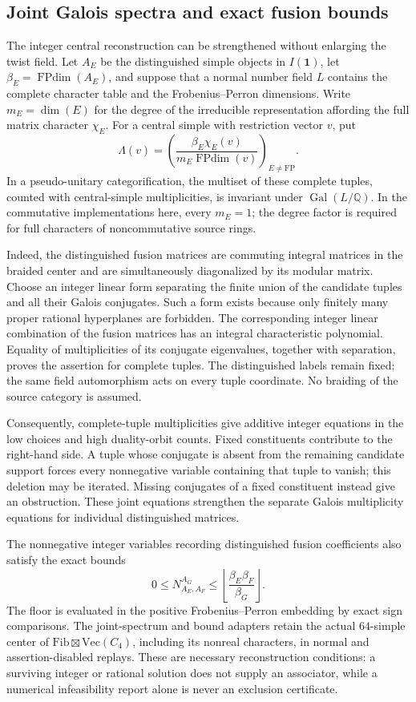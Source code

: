\subsection{Joint Galois spectra and exact fusion bounds}

The integer central reconstruction can be strengthened without enlarging
the twist field.  Let $A_E$ be the distinguished simple objects in
$I(\mathbf1)$, let $\beta_E=\operatorname{FPdim}(A_E)$, and suppose that
a normal number field $L$ contains the complete character table and the
Frobenius--Perron dimensions.  Write $m_E=\dim(E)$ for the degree of the
irreducible representation affording the full matrix character $\chi_E$.
For a central simple with restriction vector $v$, put
\[
 \Lambda(v)=\left(
 \frac{\beta_E\chi_E(v)}{m_E\operatorname{FPdim}(v)}
 \right)_{E\ne\mathrm{FP}}.
\]
In a pseudo-unitary categorification, the multiset of these complete
tuples, counted with central-simple multiplicities, is invariant under
$\operatorname{Gal}(L/\mathbb Q)$.  In the commutative implementations
here, every $m_E=1$; the degree factor is required for full characters
of noncommutative source rings.

Indeed, the distinguished fusion matrices are commuting integral
matrices in the braided center and are simultaneously diagonalized by
its modular matrix.  Choose an integer linear form separating the
finite union of the candidate tuples and all their Galois conjugates.
Such a form exists because only finitely many proper rational
hyperplanes are forbidden.  The corresponding integer linear
combination of the fusion matrices has an integral characteristic
polynomial.  Equality of multiplicities of its conjugate eigenvalues,
together with separation, proves the assertion for complete tuples.
The distinguished labels remain fixed; the same field automorphism
acts on every tuple coordinate.  No braiding of the source category is
assumed.

Consequently, complete-tuple multiplicities give additive integer
equations in the low choices and high duality-orbit counts.  Fixed
constituents contribute to the right-hand side.  A tuple whose
conjugate is absent from the remaining candidate support forces every
nonnegative variable containing that tuple to vanish; this deletion
may be iterated.  Missing conjugates of a fixed constituent instead
give an obstruction.  These joint equations strengthen the separate
Galois multiplicity equations for individual distinguished matrices.

The nonnegative integer variables recording distinguished fusion
coefficients also satisfy the exact bounds
\[
 0\le N_{A_E,A_F}^{A_G}
 \le \left\lfloor\frac{\beta_E\beta_F}{\beta_G}\right\rfloor.
\]
The floor is evaluated in the positive Frobenius--Perron embedding by
exact sign comparisons.  The joint-spectrum and bound adapters retain
the actual $64$-simple center of $\mathrm{Fib}\boxtimes\mathrm{Vec}(C_4)$,
including its nonreal characters, in normal and assertion-disabled
replays.  These are necessary reconstruction conditions: a surviving
integer or rational solution does not supply an associator, while a
numerical infeasibility report alone is never an exclusion certificate.
